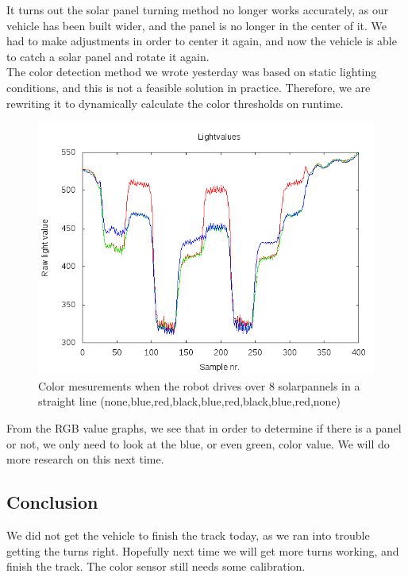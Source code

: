 It turns out the solar panel turning method no longer works accurately, as
our vehicle has been built wider, and the panel is no longer in the
center of it. We had to make adjustments in order to center it again,
and now the vehicle is able to catch a solar panel and rotate it
again.\\The color detection method we wrote yesterday was based on
static lighting conditions, and this is not a feasible solution in
practice. Therefore, we are rewriting it to dynamically calculate the
color thresholds on
runtime.
\begin{figure}[hbt]
  \centering
  \includegraphics[scale=0.5]{../experiments/2prototype/results/gnuplot/Colormesrun1.png}
  \caption{Color mesurements when the robot drives over 8 solarpannels in a straight line (none,blue,red,black,blue,red,black,blue,red,none)}
\end{figure}

From the RGB value graphs, we see that in order to determine if there is
a panel or not, we only need to look at the blue, or even green, color
value. We will do more research on this next time.

\subsection{Conclusion}

We did not get the vehicle to finish the track today, as we ran into
trouble getting the turns right. Hopefully next time we will get more
turns working, and finish the track. The color sensor still needs some
calibration.
